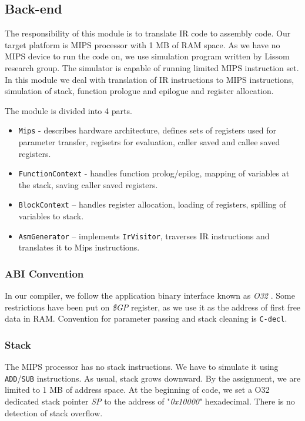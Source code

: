 \documentclass[12pt]{article}
\begin{document}
\subsection{Back-end}
The responsibility of this module is to translate IR code to assembly code. Our target platform is MIPS processor with 1 MB of RAM space. As we have no MIPS device to run the code on, we use simulation program written by Lissom research group. The simulator is capable of running limited MIPS instruction set. In this module we deal with translation of IR instructions to MIPS instructions, simulation of stack, function prologue and epilogue and register allocation.

The module is divided into 4 parts. 
\begin{itemize}
	\item \texttt{Mips} - describes hardware architecture, defines sets of registers used for parameter transfer, regisetrs for evaluation, caller saved and callee saved registers.
	\item \texttt{FunctionContext} - handles function prolog/epilog, mapping of variables at the stack, saving caller saved registers.
	\item \texttt{BlockContext} -- handles register allocation, loading of registers, spilling of variables to stack.
	\item \texttt{AsmGenerator} -- implements \texttt{IrVisitor}, traverses IR instructions and translates it to Mips instructions.
\end{itemize}

\subsubsection{ABI Convention}
In our compiler, we follow the application binary interface known as \textit{O32} \cite{O32}. 
Some restrictions have been put on \textit{\$GP} register, as we use it as the address of first free data in RAM.
Convention for parameter passing and stack cleaning is \texttt{C-decl}.
\subsubsection{Stack}
The MIPS processor has no stack instructions. We have to simulate it using \texttt{ADD}/\texttt{SUB} instructions. As usual, stack grows downward. By the assignment, we are limited to 1 MB of address space. At the beginning of code, we set a O32 dedicated stack pointer \textit{SP} to the address of "\textit{0x10000}" hexadecimal. There is no detection of stack overflow.
\end{document}
